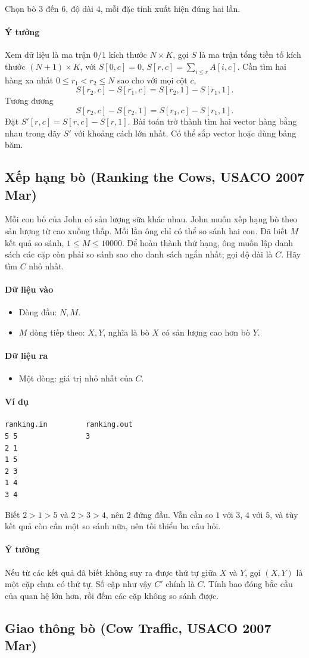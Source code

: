 \documentclass[11pt]{article}
\newcommand{\problem}[1]{\subsection{#1}}
\newcommand{\iosec}[1]{\paragraph{#1}}
\begin{document}
Chọn bò \(3\) đến \(6\), độ dài \(4\), mỗi đặc tính xuất hiện đúng hai lần.

\iosec{Ý tưởng}
Xem dữ liệu là ma trận \(0/1\) kích thước \(N\times K\), gọi \(S\) là ma trận tổng tiền tố kích thước \((N+1)\times K\), với \(S[0,c]=0\), \(S[r,c]=\sum_{i\le r}A[i,c]\). Cần tìm hai hàng xa nhất \(0\le r_1<r_2\le N\) sao cho với mọi cột \(c\),
\[
  S[r_2,c]-S[r_1,c]=S[r_2,1]-S[r_1,1].
\]
Tương đương
\[
  S[r_2,c]-S[r_2,1]=S[r_1,c]-S[r_1,1].
\]
Đặt \(S'[r,c]=S[r,c]-S[r,1]\). Bài toán trở thành tìm hai vector hàng bằng nhau trong dãy \(S'\) với khoảng cách lớn nhất. Có thể sắp vector hoặc dùng bảng băm.

\problem{Xếp hạng bò (Ranking the Cows, USACO 2007 Mar)}

Mỗi con bò của John có sản lượng sữa khác nhau. John muốn xếp hạng bò theo sản lượng từ cao xuống thấp. Mỗi lần ông chỉ có thể so sánh hai con. Đã biết \(M\) kết quả so sánh, \(1 \le M \le 10000\). Để hoàn thành thứ hạng, ông muốn lập danh sách các cặp còn phải so sánh sao cho danh sách ngắn nhất; gọi độ dài là \(C\). Hãy tìm \(C\) nhỏ nhất.

\iosec{Dữ liệu vào}
\begin{itemize}
  \item Dòng đầu: \(N,M\).
  \item \(M\) dòng tiếp theo: \(X,Y\), nghĩa là bò \(X\) có sản lượng cao hơn bò \(Y\).
\end{itemize}

\iosec{Dữ liệu ra}
\begin{itemize}
  \item Một dòng: giá trị nhỏ nhất của \(C\).
\end{itemize}

\iosec{Ví dụ}
\begin{verbatim}
ranking.in         ranking.out
5 5                3
2 1
1 5
2 3
1 4
3 4
\end{verbatim}

Biết \(2>1>5\) và \(2>3>4\), nên \(2\) đứng đầu. Vẫn cần so \(1\) với \(3\), \(4\) với \(5\), và tùy kết quả còn cần một so sánh nữa, nên tối thiểu ba câu hỏi.

\iosec{Ý tưởng}
Nếu từ các kết quả đã biết không suy ra được thứ tự giữa \(X\) và \(Y\), gọi \((X,Y)\) là một cặp chưa có thứ tự. Số cặp như vậy \(C'\) chính là \(C\). Tính bao đóng bắc cầu của quan hệ lớn hơn, rồi đếm các cặp không so sánh được.

\problem{Giao thông bò (Cow Traffic, USACO 2007 Mar)}
\end{document}
